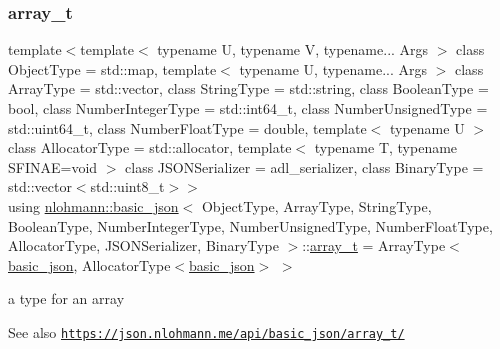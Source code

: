 \subsubsection{\texorpdfstring{array\+\_\+t}{array\_t}}
{\footnotesize\ttfamily template$<$template$<$ typename U, typename V, typename... Args $>$ class Object\+Type = std\+::map, template$<$ typename U, typename... Args $>$ class Array\+Type = std\+::vector, class String\+Type  = std\+::string, class Boolean\+Type  = bool, class Number\+Integer\+Type  = std\+::int64\+\_\+t, class Number\+Unsigned\+Type  = std\+::uint64\+\_\+t, class Number\+Float\+Type  = double, template$<$ typename U $>$ class Allocator\+Type = std\+::allocator, template$<$ typename T, typename S\+F\+I\+N\+A\+E=void $>$ class J\+S\+O\+N\+Serializer = adl\+\_\+serializer, class Binary\+Type  = std\+::vector$<$std\+::uint8\+\_\+t$>$$>$ \\
using \hyperlink{classnlohmann_1_1basic__json}{nlohmann\+::basic\+\_\+json}$<$ Object\+Type, Array\+Type, String\+Type, Boolean\+Type, Number\+Integer\+Type, Number\+Unsigned\+Type, Number\+Float\+Type, Allocator\+Type, J\+S\+O\+N\+Serializer, Binary\+Type $>$\+::\hyperlink{classnlohmann_1_1basic__json_a858c1cf8407bc06494e3a1114a3b73e7}{array\+\_\+t} =  Array\+Type$<$\hyperlink{classnlohmann_1_1basic__json}{basic\+\_\+json}, Allocator\+Type$<$\hyperlink{classnlohmann_1_1basic__json}{basic\+\_\+json}$>$ $>$}



a type for an array 

\begin{DoxySeeAlso}{See also}
\href{https://json.nlohmann.me/api/basic_json/array_t/}{\tt https\+://json.\+nlohmann.\+me/api/basic\+\_\+json/array\+\_\+t/} 
\end{DoxySeeAlso}
\mbox{\label{classnlohmann_1_1basic__json_ad6c955145bebde84d93991ffed7cd389}} 
